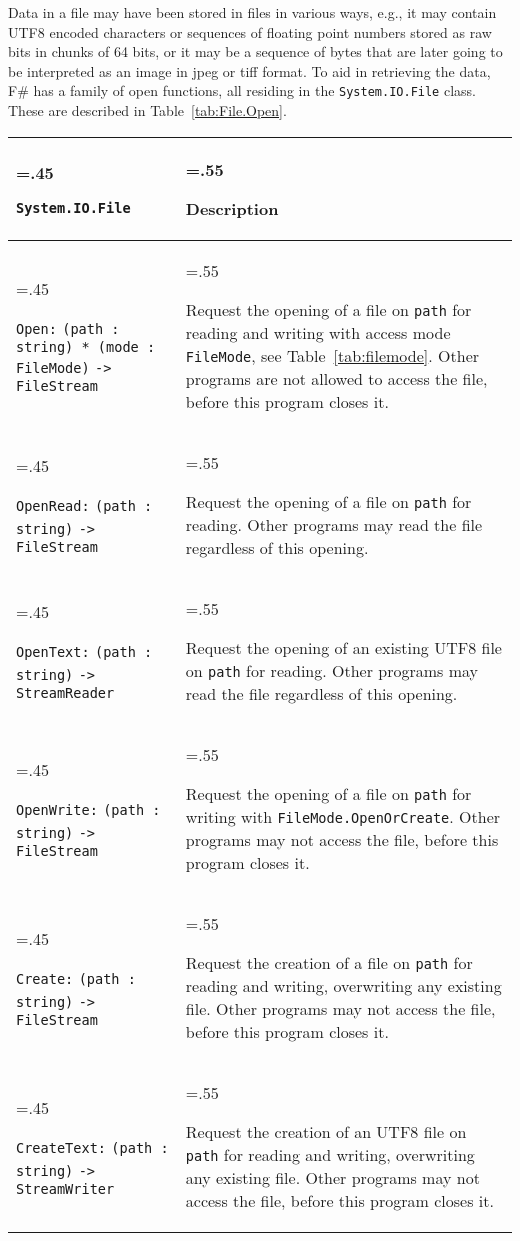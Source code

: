 Data in a file may have been stored in files in various ways, e.g., it may contain UTF8 encoded characters or sequences of floating point numbers stored as raw bits in chunks of 64 bits, or it may be a sequence of bytes that are later going to be interpreted as an image in jpeg or tiff format. To aid in retrieving the data, F\# has a family of open functions, all residing in the \lstinline!System.IO.File! class. These are described in Table~\ref{tab:File.Open}.
\begin{table}
  \begin{center}
    \begin{tabularx}{\linewidth}{|>{\hsize=.45\hsize\raggedright\arraybackslash}X|>{\hsize=.55\hsize\raggedright\arraybackslash}X|}
      \hline
      \lstinline{System.IO.File} & Description\\
      \hline
      \lstinline{Open:} \mbox{\lstinline{(path : string) * (mode : FileMode)}} \mbox{\lstinline{-> FileStream}} & Request the opening of a file on \lstinline{path} for reading and writing with access mode \lstinline!FileMode!, see Table~\ref{tab:filemode}. Other programs are not allowed to access the file, before this program closes it.\\
      \hline
      \lstinline{OpenRead:} \mbox{\lstinline{(path : string)}}  \mbox{\lstinline{-> FileStream}} & Request the opening of a file on \lstinline{path} for reading. Other programs may read the file regardless of this opening.\\
      \hline
      \lstinline{OpenText:} \mbox{\lstinline{(path : string)}}  \mbox{\lstinline{-> StreamReader}} & Request the opening of an existing UTF8 file on \lstinline{path} for reading. Other programs may read the file regardless of this opening.\\
      \hline
      \lstinline{OpenWrite:} \mbox{\lstinline{(path : string)}}  \mbox{\lstinline{-> FileStream}} & Request the opening of a file on \lstinline{path} for writing with \lstinline{FileMode.OpenOrCreate}. Other programs may not access the file, before this program closes it.\\
      \hline
      \lstinline{Create:} \mbox{\lstinline{(path : string)}} \mbox{\lstinline{-> FileStream}} & Request the creation of a file on \lstinline{path} for reading and writing, overwriting any existing file. Other programs may not access the file, before this program closes it.\\
      \hline
      \lstinline{CreateText:} \mbox{\lstinline{(path : string)}} \mbox{\lstinline{-> StreamWriter}} & Request the creation of an UTF8 file on \lstinline{path} for reading and writing, overwriting any existing file. Other programs may not access the file, before this program closes it.\\

\end{tabularx}
\end{center}
\end{table}
